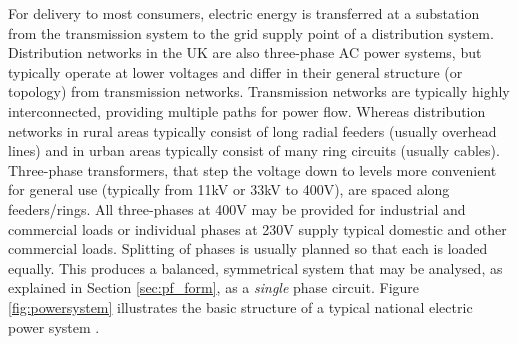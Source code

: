 
For delivery to most consumers, electric energy is transferred at a
substation from the transmission system to the grid supply point of a distribution
system.  Distribution networks in the UK are also three-phase AC power systems,
but typically operate at lower voltages and differ in their general
structure (or topology) from transmission networks.  Transmission networks are
typically highly interconnected, providing multiple paths for power flow.
Whereas distribution networks in rural areas typically consist of long radial
feeders (usually overhead lines) and in urban areas typically consist of many
ring circuits (usually cables).  Three-phase transformers, that step the voltage
down to levels more convenient for general use (typically from 11kV or 33kV to 400V), are
spaced along feeders/rings. All three-phases at 400V may be provided for
industrial and commercial loads or individual phases at 230V supply typical
domestic and other commercial loads. Splitting of phases is usually planned so
that each is loaded equally. This produces a balanced, symmetrical system that
may be analysed, as explained in Section \ref{sec:pf_form}, as a
\textit{single} phase circuit.  Figure \ref{fig:powersystem} illustrates the
basic structure of a typical national electric power system \cite{blackout04}.

